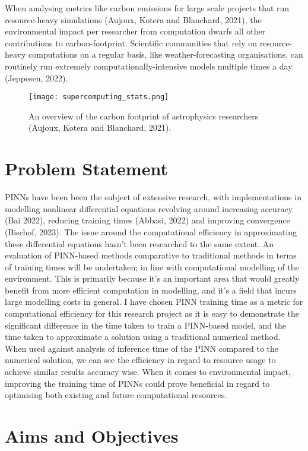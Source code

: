 \documentclass[12pt, openany]{book}
\begin{document}
When analysing metrics like carbon emissions for large scale projects that run resource-heavy simulations (Aujoux, Kotera and Blanchard, 2021), the environmental impact per researcher from computation dwarfs all other contributions to carbon-footprint. Scientific communities that rely on resource-heavy computations on a regular basis, like weather-forecasting organisations, can routinely run extremely computationally-intensive models multiple times a day (Jeppesen, 2022).

\begin{figure}[!h]
    \centering
    \texttt{[image: supercomputing\_stats.png]}
    \caption{An overview of the carbon footprint of astrophysics researchers (Aujoux, Kotera and Blanchard, 2021).}
    \label{fig:enter-label}
\end{figure}

\section{Problem Statement}

PINNs have been been the subject of extensive research, with implementations in modelling nonlinear differential equations revolving around increasing accuracy (Bai 2022), reducing training times (Abbasi, 2022) and improving convergence (Bischof, 2023). The issue around the computational efficiency in approximating these differential equations hasn't been researched to the same extent. An evaluation of PINN-based methods comparative to traditional methods in terms of training times will be undertaken; in line with computational modelling of the environment. This is primarily because it's an important area that would greatly benefit from more efficient computation in modelling, and it's a field that incurs large modelling costs in general. I have chosen PINN training time as a metric for computational efficiency for this research project as it is easy to demonstrate the significant difference in the time taken to train a PINN-based model, and the time taken to approximate a solution using a traditional numerical method. When used against analysis of inference time of the PINN compared to the numerical solution, we can see the efficiency in regard to resource usage to achieve similar results accuracy wise. When it comes to environmental impact, improving the training time of PINNs could prove beneficial in regard to optimising both existing and future computational resources. 

\section{Aims and Objectives}
\end{document}
